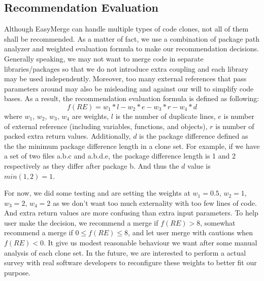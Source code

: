 \documentclass{acm_proc_article-sp}
\begin{document}
\subsection{Recommendation Evaluation}
Although EasyMerge can handle multiple types of code clones, not all of them shall be recommended. As a matter of fact, we use a combination of 
package path analyzer and weighted evaluation formula to make our recommendation decisions. Generally speaking, we may not want to merge code
in separate libraries/packages so that we do not introduce extra coupling and each library may be used independently. 
Moreover, too many external references that pass parameters around may also be misleading and against our will to simplify code bases.
As a result, the recommendation evaluation formula is defined as following:
\begin{displaymath}
f(RE) = w_{1} * l - w_{2} * e - w_{3} * r - w_{4} * d
\end{displaymath}
where $w_{1}$, $w_{2}$, $w_{3}$, $w_{4}$ are weights,  $l$ is the number of duplicate lines, $e$ is number of external reference (including variables, functions, and objects),
$r$ is number of packed extra return values. Additionally, $d$ is the package difference defined as the the minimum package difference length in a clone set.
For example, if we have a set of two files a.b.c and a.b.d.e, the package difference length is 1 and 2 respectively as they differ after package b. And thus the $d$ value is
$min(1, 2) = 1$.

For now, we did some testing and are setting the weights at 
$w_{1} = 0.5$, $w_{2} = 1$, $w_{3} = 2$, $w_{4} = 2$ as we don't want too much externality with too few lines of code. And extra return values are more confusing than
extra input parameters. To help user make the decision, we recommend a merge if $f(RE) > 8$, somewhat recommend a merge if $ 0 \le f(RE) \le 8$, and let user merge
with cautions when $f(RE) < 0$.
It give us modest reasonable behaviour we want after some manual analysis of each clone set.
In the future, we are interested to perform a actual survey with real software developers to reconfigure these weights to better fit our purpose.
\end{document}

